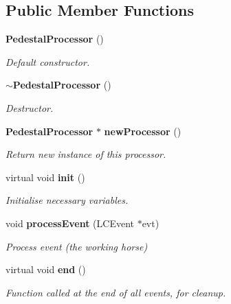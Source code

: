 \subsection*{Public Member Functions}
\begin{DoxyCompactItemize}
\item 
{\bf Pedestal\-Processor} ()\label{classCALICE_1_1PedestalProcessor_a6bc9bd585510a41c6ca0f563ef93e60d}

\begin{DoxyCompactList}\small\item\em Default constructor. \end{DoxyCompactList}\item 
{\bf $\sim$\-Pedestal\-Processor} ()\label{classCALICE_1_1PedestalProcessor_a7afefac07d219138d0cbb0a172292584}

\begin{DoxyCompactList}\small\item\em Destructor. \end{DoxyCompactList}\item 
{\bf Pedestal\-Processor} $\ast$ {\bf new\-Processor} ()\label{classCALICE_1_1PedestalProcessor_aaf59f11eb0d6cb2fd57e4093b2174edd}

\begin{DoxyCompactList}\small\item\em Return new instance of this processor. \end{DoxyCompactList}\item 
virtual void {\bf init} ()\label{classCALICE_1_1PedestalProcessor_a936b946a56f3e0c6203f413161d0b534}

\begin{DoxyCompactList}\small\item\em Initialise necessary variables. \end{DoxyCompactList}\item 
void {\bf process\-Event} (L\-C\-Event $\ast$evt)
\begin{DoxyCompactList}\small\item\em Process event (the working horse) \end{DoxyCompactList}\item 
virtual void {\bf end} ()\label{classCALICE_1_1PedestalProcessor_ace047025eb794a92d3abbfd089eb6b2c}

\begin{DoxyCompactList}\small\item\em Function called at the end of all events, for cleanup. \end{DoxyCompactList}\end{DoxyCompactItemize}
